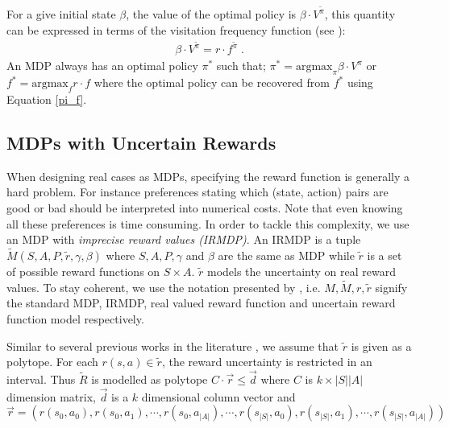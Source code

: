 \documentclass[runningheads,a4paper]{llncs}
\begin{document}
For a give initial state $\beta$, the value of the optimal policy is $\beta \cdot V^{\tilde{\pi}}$, this quantity can be expressed in terms of the visitation frequency function (see \cite{Puterman1994}): 
\begin{align}\label{f-v}
\beta \cdot V^{\tilde{\pi}} = r \cdot f^{\tilde{\pi}}\;.
\end{align}
An MDP always has an optimal policy $\pi^*$ such that; $\pi^* = \text{argmax}_{\pi} \beta \cdot V^{\pi}$ or $f^{*} = \text{argmax}_{f} r \cdot f$ where the optimal policy can be recovered from $f^*$ using Equation \ref{pi_f}. 

\subsection{MDPs with Uncertain Rewards}
When designing real cases as MDPs, specifying the reward function is generally a hard problem. For instance preferences stating which (state, action) pairs are good or bad should be interpreted into numerical costs. Note that even knowing all these preferences is time consuming. In order to
tackle this complexity, we use an MDP with \textit{imprecise reward values (IRMDP)}. An IRMDP \citep{Regan2009} is a tuple $\tilde{M}(S, A, P, \tilde{r}, \gamma, \beta)$ where $S, A, P, \gamma$ and $\beta$ are the same as MDP while $\tilde{r}$ is a set of possible reward functions on $S \times A$. $\tilde{r}$ models the uncertainty on real reward values. To stay coherent, we use the notation presented by , i.e. $M, \tilde{M}, r, \tilde{r}$ signify the standard MDP, IRMDP, real valued reward function and uncertain reward function model respectively.  

Similar to several previous works in the literature \cite{Ahmed2017,alizadeh2015,benavent2018,Regan2009,Weng2013}, we assume that $\tilde{r}$ is given as a polytope. For each $r(s,a) \in \tilde{r}$, the reward uncertainty is restricted in an interval. Thus $\tilde{R}$ is modelled as polytope $C \cdot \overrightarrow{r} \leq \overrightarrow{d}$ where $C$ is $k \times |S||A|$ dimension matrix, $\overrightarrow{d}$ is a $k$ dimensional column vector and $\overrightarrow{r} = (r(s_0,a_0), r(s_0,a_1), \cdots, r(s_0,a_{|A|}), \cdots, r( s_{|S|},a_0), r(s_{|S|},a_1), \cdots, r(s_{|S|},a_{|A|}) )$
 
\end{document}
